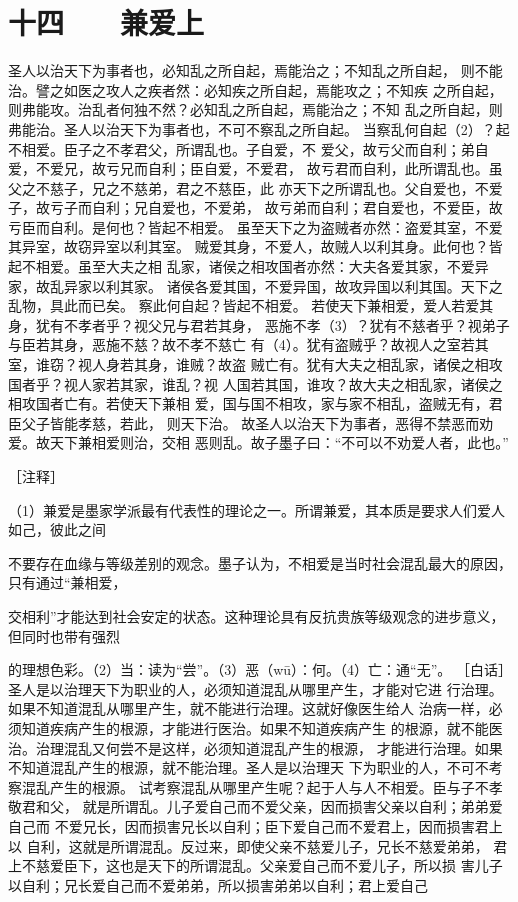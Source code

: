 \documentclass[12pt,UTF8]{ctexbook}
\begin{document}
\chapter{十四　　兼爱上}

圣人以治天下为事者也，必知乱之所自起，焉能治之；不知乱之所自起， 
则不能治。譬之如医之攻人之疾者然：必知疾之所自起，焉能攻之；不知疾 
之所自起，则弗能攻。治乱者何独不然？必知乱之所自起，焉能治之；不知 
乱之所自起，则弗能治。圣人以治天下为事者也，不可不察乱之所自起。 
当察乱何自起（2）？起不相爱。臣子之不孝君父，所谓乱也。子自爱，不 
爱父，故亏父而自利；弟自爱，不爱兄，故亏兄而自利；臣自爱，不爱君， 
故亏君而自利，此所谓乱也。虽父之不慈子，兄之不慈弟，君之不慈臣，此 
亦天下之所谓乱也。父自爱也，不爱子，故亏子而自利；兄自爱也，不爱弟， 
故亏弟而自利；君自爱也，不爱臣，故亏臣而自利。是何也？皆起不相爱。 
虽至天下之为盗贼者亦然：盗爱其室，不爱其异室，故窃异室以利其室。 
贼爱其身，不爱人，故贼人以利其身。此何也？皆起不相爱。虽至大夫之相 
乱家，诸侯之相攻国者亦然：大夫各爱其家，不爱异家，故乱异家以利其家。 
诸侯各爱其国，不爱异国，故攻异国以利其国。天下之乱物，具此而已矣。 
察此何自起？皆起不相爱。 
若使天下兼相爱，爱人若爱其身，犹有不孝者乎？视父兄与君若其身， 
恶施不孝（3）？犹有不慈者乎？视弟子与臣若其身，恶施不慈？故不孝不慈亡 
有（4）。犹有盗贼乎？故视人之室若其室，谁窃？视人身若其身，谁贼？故盗 
贼亡有。犹有大夫之相乱家，诸侯之相攻国者乎？视人家若其家，谁乱？视 
人国若其国，谁攻？故大夫之相乱家，诸侯之相攻国者亡有。若使天下兼相 
爱，国与国不相攻，家与家不相乱，盗贼无有，君臣父子皆能孝慈，若此， 
则天下治。 
故圣人以治天下为事者，恶得不禁恶而劝爱。故天下兼相爱则治，交相 
恶则乱。故子墨子曰：“不可以不劝爱人者，此也。” 


［注释］ 

（1）兼爱是墨家学派最有代表性的理论之一。所谓兼爱，其本质是要求人们爱人如己，彼此之间 

不要存在血缘与等级差别的观念。墨子认为，不相爱是当时社会混乱最大的原因，只有通过“兼相爱， 

交相利”才能达到社会安定的状态。这种理论具有反抗贵族等级观念的进步意义，但同时也带有强烈 

的理想色彩。（2）当：读为“尝”。（3）恶（wū）：何。（4）亡：通“无”。 
［白话］ 
圣人是以治理天下为职业的人，必须知道混乱从哪里产生，才能对它进 
行治理。如果不知道混乱从哪里产生，就不能进行治理。这就好像医生给人 
治病一样，必须知道疾病产生的根源，才能进行医治。如果不知道疾病产生 
的根源，就不能医治。治理混乱又何尝不是这样，必须知道混乱产生的根源， 
才能进行治理。如果不知道混乱产生的根源，就不能治理。圣人是以治理天 
下为职业的人，不可不考察混乱产生的根源。 
试考察混乱从哪里产生呢？起于人与人不相爱。臣与子不孝敬君和父， 
就是所谓乱。儿子爱自己而不爱父亲，因而损害父亲以自利；弟弟爱自己而 
不爱兄长，因而损害兄长以自利；臣下爱自己而不爱君上，因而损害君上以 
自利，这就是所谓混乱。反过来，即使父亲不慈爱儿子，兄长不慈爱弟弟， 
君上不慈爱臣下，这也是天下的所谓混乱。父亲爱自己而不爱儿子，所以损 
害儿子以自利；兄长爱自己而不爱弟弟，所以损害弟弟以自利；君上爱自己 
\end{document}

